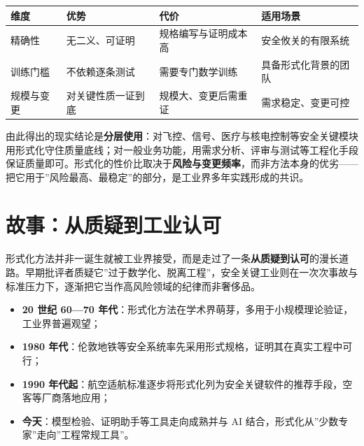 \documentclass[
]{ctexbook}
\providecommand{\tightlist}{\setlength{\itemsep}{0pt}\setlength{\parskip}{0pt} }
\newcounter{none}
\begin{document}
{\def\LTcaptype{none} %
\begin{longtable}[]{@{}
  >{\raggedright\arraybackslash}p{}
  >{\raggedright\arraybackslash}p{}
  >{\raggedright\arraybackslash}p{}
  >{\raggedright\arraybackslash}p{}@{}}
\toprule\noalign{}
\begin{minipage}[b]{\linewidth}\raggedright
维度
\end{minipage} & \begin{minipage}[b]{\linewidth}\raggedright
优势
\end{minipage} & \begin{minipage}[b]{\linewidth}\raggedright
代价
\end{minipage} & \begin{minipage}[b]{\linewidth}\raggedright
适用场景
\end{minipage} \\
\midrule\noalign{}
\endhead
\bottomrule\noalign{}
\endlastfoot
精确性 & 无二义、可证明 & 规格编写与证明成本高 & 安全攸关的有限系统 \\
训练门槛 & 不依赖逐条测试 & 需要专门数学训练 & 具备形式化背景的团队 \\
规模与变更 & 对关键性质一证到底 & 规模大、变更后需重证 &
需求稳定、变更可控 \\
\end{longtable}
}

由此得出的现实结论是\textbf{分层使用}：对飞控、信号、医疗与核电控制等安全关键模块用形式化守住质量底线；对一般业务功能，用需求分析、评审与测试等工程化手段保证质量即可。形式化的性价比取决于\textbf{风险与变更频率}，而非方法本身的优劣------把它用于''风险最高、最稳定''的部分，是工业界多年实践形成的共识。

\section{故事：从质疑到工业认可}\label{ux6545ux4e8bux4eceux8d28ux7591ux5230ux5de5ux4e1aux8ba4ux53ef}

形式化方法并非一诞生就被工业界接受，而是走过了一条\textbf{从质疑到认可}的漫长道路。早期批评者质疑它''过于数学化、脱离工程''，安全关键工业则在一次次事故与标准压力下，逐渐把它当作高风险领域的纪律而非奢侈品。

\begin{itemize}
\tightlist
\item
  \textbf{20 世纪 60---70
  年代}：形式化方法在学术界萌芽，多用于小规模理论验证，工业界普遍观望；
\item
  \textbf{1980
  年代}：伦敦地铁等安全系统率先采用形式规格，证明其在真实工程中可行；
\item
  \textbf{1990
  年代起}：航空适航标准逐步将形式化列为安全关键软件的推荐手段，空客等厂商落地应用；
\item
  \textbf{今天}：模型检验、证明助手等工具走向成熟并与 AI
  结合，形式化从''少数专家''走向''工程常规工具''。
\end{itemize}
\end{document}
